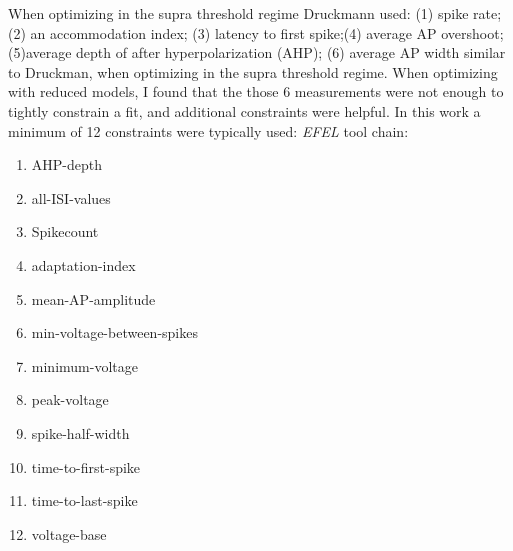 When optimizing in the supra threshold regime Druckmann used:
(1) spike rate; (2) an accommodation index; (3) latency to first spike;(4) average AP overshoot; (5)average depth of after hyperpolarization (AHP); 
(6) average AP width similar to Druckman, when optimizing in the supra threshold regime.
When optimizing with reduced models, I found that the those 6 measurements were not enough to tightly constrain a fit, and additional constraints were helpful. In this work a minimum of 12 constraints were typically used:
\emph{EFEL}
tool chain:
\begin{enumerate}
\item AHP-depth
\item all-ISI-values
\item Spikecount %
\item adaptation-index
\item mean-AP-amplitude
\item min-voltage-between-spikes
\item minimum-voltage
\item peak-voltage
\item spike-half-width
\item time-to-first-spike
\item time-to-last-spike
\item voltage-base
\end{enumerate}
